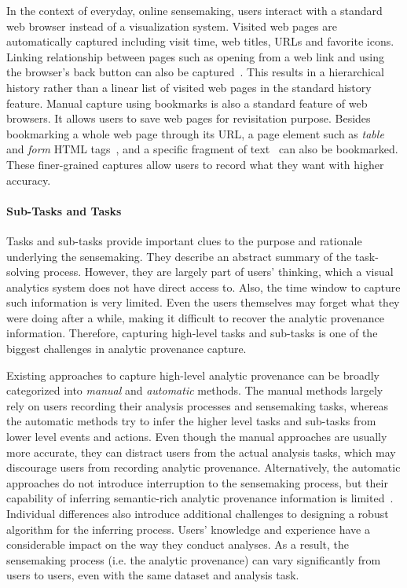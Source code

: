 In the context of everyday, online sensemaking, users interact with a standard web browser instead of a visualization system. Visited web pages are automatically captured including visit time, web titles, URLs and favorite icons. Linking relationship between pages such as opening from a web link and using the browser's back button can also be captured~\cite{Ayers1995,Hightower1998,Milic-Frayling2003}. This results in a hierarchical history rather than a linear list of visited web pages in the standard history feature. Manual capture using bookmarks is also a standard feature of web browsers. It allows users to save web pages for revisitation purpose. Besides bookmarking a whole web page through its URL, a page element such as \textit{table} and \textit{form} HTML tags~\cite{Hong2008}, and a specific fragment of text~\cite{Dontcheva2006} can also be bookmarked. These finer-grained captures allow users to record what they want with higher accuracy. 

\paragraph{Sub-Tasks and Tasks}
Tasks and sub-tasks provide important clues to the purpose and rationale underlying the sensemaking. They describe an abstract summary of the task-solving process. However, they are largely part of users' thinking, which a visual analytics system does not have direct access to. Also, the time window to capture such information is very limited. Even the users themselves may forget what they were doing after a while, making it difficult to recover the analytic provenance information. Therefore, capturing high-level tasks and sub-tasks is one of the biggest challenges in analytic provenance capture.

Existing approaches to capture high-level analytic provenance can be broadly categorized into \emph{manual} and \emph{automatic} methods. The manual methods largely rely on users recording their analysis processes and sensemaking tasks, whereas the automatic methods try to infer the higher level tasks and sub-tasks from lower level events and actions. Even though the manual approaches are usually more accurate, they can distract users from the actual analysis tasks, which may discourage users from recording analytic provenance. Alternatively, the automatic approaches do not introduce interruption to the sensemaking process, but their capability of inferring semantic-rich analytic provenance information is limited~\cite{Gotz2009}. Individual differences also introduce additional challenges to designing a robust algorithm for the inferring process. Users' knowledge and experience have a considerable impact on the way they conduct analyses. As a result, the sensemaking process (i.e. the analytic provenance) can vary significantly from users to users, even with the same dataset and analysis task. 

